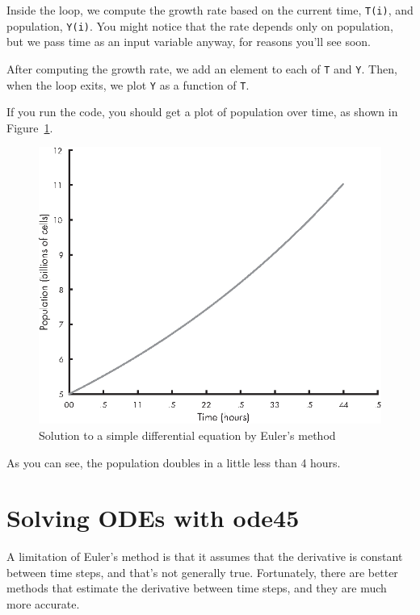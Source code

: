 Inside the loop, we compute the growth rate based on the current time, \lstinline{T(i)}, and population, \lstinline{Y(i)}.  You might notice that the rate depends only on population, but we pass time as an input variable anyway, for reasons you'll see soon.

After computing the growth rate, we add an element to each of \lstinline{T} and \lstinline{Y}.  Then, when the loop exits, we plot \lstinline{Y} as a function of \lstinline{T}.

If you run the code, you should get a plot of population over time, as shown in Figure~\ref{fig:euler}. 

\begin{figure}[ht]
\includegraphics{book/images/figure09_01_new.eps}
\caption{Solution to a simple differential equation by Euler's method}
\label{fig:euler}
\end{figure}

As you can see, the population doubles in a little less than 4 hours.


\section{Solving ODEs with ode45}
\label{ode45}

A limitation of Euler's method is that it assumes that the derivative is constant between time steps, and that's not generally true.  Fortunately, there are better methods that estimate the derivative between time steps, and they are much more accurate.

